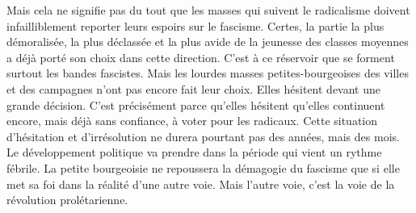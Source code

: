 \documentclass[french,twoside]{book} %
\begin{document}
Mais cela ne signifie pas du tout que les masses qui suivent le radicalisme doivent infailliblement reporter leurs espoirs sur le fascisme. Certes, la partie la plus démoralisée, la plus déclassée et la plus avide de la jeunesse des classes moyennes a déjà porté son choix dans cette direction. C’est à ce réservoir que se forment surtout les bandes fascistes. Mais les lourdes masses petites-bourgeoises des villes et des campagnes n’ont pas encore fait leur choix. Elles hésitent devant une grande décision. C’est précisément parce qu’elles hésitent qu’elles continuent encore, mais déjà sans confiance, à voter pour les radicaux. Cette situation d’hésitation et d’irrésolution ne durera pourtant pas des années, mais des mois. Le développement politique va prendre dans la période qui vient un rythme fébrile. La petite bourgeoisie ne repoussera la démagogie du fascisme que si elle met sa foi dans la réalité d’une autre voie. Mais l’autre voie, c’est la voie de la révolution prolétarienne.
\end{document}
